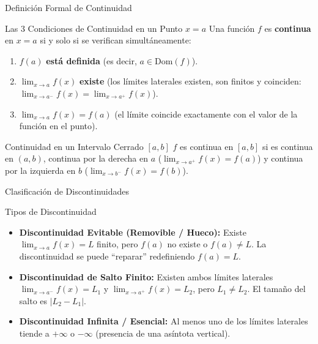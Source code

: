 \documentclass[aspectratio=169]{beamer}
\begin{document}
\begin{frame}{Definición Formal de Continuidad}
  \begin{block}{Las 3 Condiciones de Continuidad en un Punto $x = a$}
    Una función $f$ es \textbf{continua} en $x = a$ si y solo si se verifican simultáneamente:
    \begin{enumerate}
      \item $f(a)$ \textbf{está definida} (es decir, $a \in \text{Dom}(f)$).
      \item $\lim_{x \to a} f(x)$ \textbf{existe} (los límites laterales existen, son finitos y coinciden: $\lim_{x \to a^-} f(x) = \lim_{x \to a^+} f(x)$).
      \item $\lim_{x \to a} f(x) = f(a)$ (el límite coincide exactamente con el valor de la función en el punto).
    \end{enumerate}
  \end{block}

  \vspace{4pt}
  \begin{block}{Continuidad en un Intervalo Cerrado $[a, b]$}
    $f$ es continua en $[a, b]$ si es continua en $(a, b)$, continua por la derecha en $a$ ($\lim_{x \to a^+} f(x) = f(a)$) y continua por la izquierda en $b$ ($\lim_{x \to b^-} f(x) = f(b)$).
  \end{block}
\end{frame}

\begin{frame}{Clasificación de Discontinuidades}
  \begin{block}{Tipos de Discontinuidad}
    \begin{itemize}
      \item \textbf{Discontinuidad Evitable (Removible / Hueco):}
            Existe $\lim_{x \to a} f(x) = L$ finito, pero $f(a)$ no existe o $f(a) \neq L$. La discontinuidad se puede ``reparar'' redefiniendo $f(a) = L$.
      \item \textbf{Discontinuidad de Salto Finito:}
            Existen ambos límites laterales $\lim_{x \to a^-} f(x) = L_1$ y $\lim_{x \to a^+} f(x) = L_2$, pero $L_1 \neq L_2$. El tamaño del salto es $|L_2 - L_1|$.
      \item \textbf{Discontinuidad Infinita / Esencial:}
            Al menos uno de los límites laterales tiende a $+\infty$ o $-\infty$ (presencia de una asíntota vertical).
    \end{itemize}
  \end{block}
\end{frame}
\end{document}
